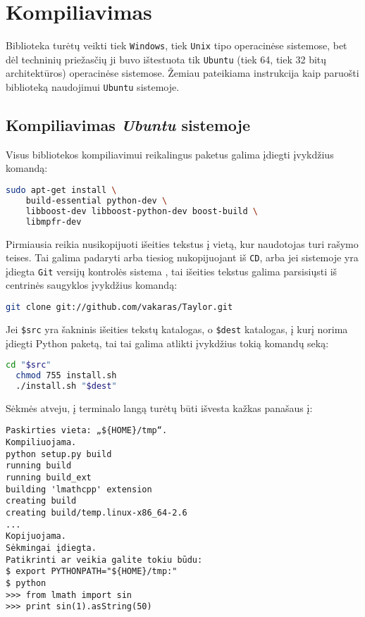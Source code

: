 \chapter{Kompiliavimas}

Biblioteka turėtų veikti tiek \verb|Windows|, tiek 
\verb|Unix| tipo operacinėse sistemose, bet dėl techninių priežasčių
ji buvo ištestuota tik \verb|Ubuntu| (tiek 64, tiek 32 bitų 
architektūros) operacinėse sistemose. Žemiau pateikiama instrukcija
kaip paruošti biblioteką naudojimui \verb|Ubuntu| sistemoje.

\section{Kompiliavimas \emph{Ubuntu} sistemoje}

Visus bibliotekos kompiliavimui reikalingus paketus galima įdiegti įvykdžius
komandą:
\begin{lstlisting}[language=bash]
  sudo apt-get install \
    build-essential python-dev \
    libboost-dev libboost-python-dev boost-build \
    libmpfr-dev
\end{lstlisting}

Pirmiausia reikia nusikopijuoti išeities tekstus į vietą, kur naudotojas
turi rašymo teises. Tai galima padaryti arba tiesiog nukopijuojant
iš \verb|CD|, arba jei sistemoje yra įdiegta \verb|Git| versijų kontrolės
sistema \cite{git}, tai išeities tekstus galima parsisiųsti iš centrinės
saugyklos įvykdžius komandą:

\begin{lstlisting}[language=bash]
  git clone git://github.com/vakaras/Taylor.git  
\end{lstlisting}

Jei \verb|$src| yra šakninis išeities tekstų katalogas, o \verb|$dest|
katalogas, į kurį norima įdiegti Python paketą, tai tai galima 
atlikti įvykdžius tokią komandų seką:

\begin{lstlisting}[language=bash]
  cd "$src"
  chmod 755 install.sh
  ./install.sh "$dest"
\end{lstlisting}

Sėkmės atveju, į terminalo langą turėtų būti išvesta kažkas panašaus į:
\begin{verbatim}
Paskirties vieta: „${HOME}/tmp“.
Kompiliuojama.
python setup.py build
running build
running build_ext
building 'lmathcpp' extension
creating build
creating build/temp.linux-x86_64-2.6
...
Kopijuojama.
Sėkmingai įdiegta.
Patikrinti ar veikia galite tokiu būdu:
$ export PYTHONPATH="${HOME}/tmp:"
$ python
>>> from lmath import sin
>>> print sin(1).asString(50)
\end{verbatim}

